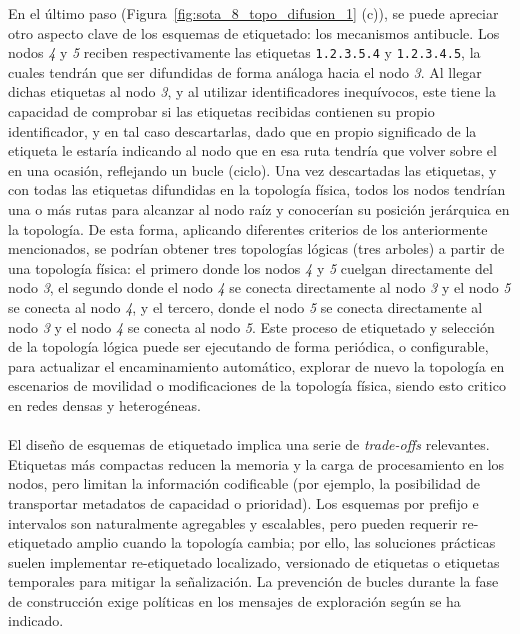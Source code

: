 En el último paso (Figura~\ref{fig:sota_8_topo_difusion_1} (c)), se puede apreciar otro aspecto clave de los esquemas de etiquetado: los mecanismos antibucle. Los nodos \textit{4} y \textit{5} reciben respectivamente las etiquetas \texttt{1.2.3.5.4} y \texttt{1.2.3.4.5}, la cuales tendrán que ser difundidas de forma análoga hacia el nodo \textit{3}. Al llegar dichas etiquetas al nodo \textit{3}, y al utilizar identificadores inequívocos, este tiene la capacidad de comprobar si las etiquetas recibidas contienen su propio identificador, y en tal caso descartarlas, dado que en propio significado de la etiqueta le estaría indicando al nodo que en esa ruta tendría que volver sobre el en una ocasión, reflejando un bucle (ciclo). Una vez descartadas las etiquetas, y con todas las etiquetas difundidas en la topología física, todos los nodos tendrían una o más rutas para alcanzar al nodo raíz y conocerían su posición jerárquica en la topología. De esta forma, aplicando diferentes criterios de los anteriormente mencionados, se podrían obtener tres topologías lógicas (tres arboles) a partir de una topología física: el primero donde los nodos \textit{4} y \textit{5} cuelgan directamente del nodo \textit{3}, el segundo donde el nodo \textit{4} se conecta directamente al nodo \textit{3} y el nodo \textit{5} se conecta al nodo \textit{4}, y el tercero, donde el nodo \textit{5} se conecta directamente al nodo \textit{3} y el nodo \textit{4} se conecta al nodo \textit{5}. Este proceso de etiquetado y selección de la topología lógica puede ser ejecutando de forma periódica, o configurable, para actualizar el encaminamiento automático, explorar de nuevo la topología en escenarios de movilidad o modificaciones de la topología física, siendo esto critico en redes densas y heterogéneas.\\
\\
El diseño de esquemas de etiquetado implica una serie de \textit{trade-offs} relevantes. Etiquetas más compactas reducen la memoria y la carga de procesamiento en los nodos, pero limitan la información codificable (por ejemplo, la posibilidad de transportar metadatos de capacidad o prioridad). Los esquemas por prefijo e intervalos son naturalmente agregables y escalables, pero pueden requerir re-etiquetado amplio cuando la topología cambia; por ello, las soluciones prácticas suelen implementar re-etiquetado localizado, versionado de etiquetas o etiquetas temporales para mitigar la señalización. La prevención de bucles durante la fase de construcción exige políticas en los mensajes de exploración según se ha indicado.\\
